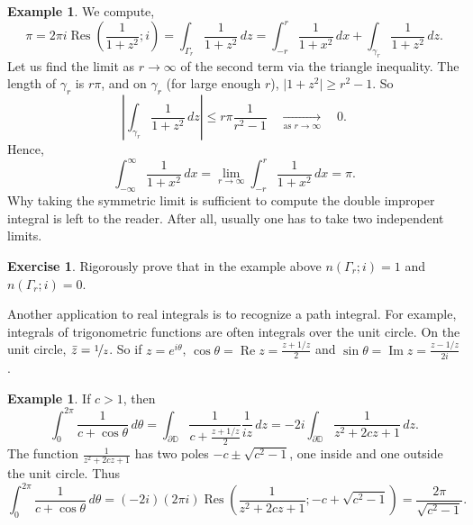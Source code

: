 \documentclass[12pt,openany]{book}
\renewcommand{\Re}{\operatorname{Re}}
\renewcommand{\Im}{\operatorname{Im}}
\newcommand{\sabs}[1]{\lvert {#1} \rvert}
\newcommand{\abs}[1]{\left\lvert {#1} \right\rvert}
\newcommand{\D}{{\mathbb{D}}}
\theoremstyle{plain}
\theoremstyle{remark}
\theoremstyle{definition}
\newenvironment{exbox}{%
    \def\FrameCommand{\vrule width 1pt \relax\hspace{10pt}}%
    \MakeFramed{\advance\hsize-\width\FrameRestore}%
}{%
    \endMakeFramed
}
\theoremstyle{exercise}
\newtheorem{exercise}{Exercise}[section]
\theoremstyle{example}
\newtheorem{example}[thm]{Example}
\begin{document}
\begin{example}
We compute,
\begin{equation*}
\pi 
=
2 \pi i \operatorname{Res}\left(\frac{1}{1+z^2};i\right) =
\int_{\Gamma_r} \frac{1}{1+z^2} \, dz
=
\int_{-r}^r \frac{1}{1+x^2} \, dx
+
\int_{\gamma_r} \frac{1}{1+z^2} \, dz .
\end{equation*}
Let us find the limit as $r \to \infty$ of the second term
via the triangle inequality.  The length of $\gamma_r$ is $r\pi$,
and on $\gamma_r$ (for large enough $r$),
$\sabs{1+z^2} \geq r^2-1$.  So
\begin{equation*}
\abs{
\int_{\gamma_r} \frac{1}{1+z^2} \, dz 
}
\leq
r \pi \frac{1}{r^2-1}
\quad\underset{\text{as } r \to \infty}{\to}\quad 0 .
\end{equation*}
Hence,
\begin{equation*}
\int_{-\infty}^\infty
\frac{1}{1+x^2} \, dx
=
\lim_{r\to \infty} \int_{-r}^r 
\frac{1}{1+x^2} \, dx
= \pi .
\end{equation*}
Why taking the symmetric limit is sufficient to compute the double improper
integral is left to the reader.  After all, usually one has to
take two independent limits.
\end{example}

\begin{exbox}
\begin{exercise}
Rigorously prove that in the example above
$n(\Gamma_r;i) = 1$ and
$n(\Gamma_r;i) = 0$.
\end{exercise}
\end{exbox}

Another application to real integrals is to recognize 
a path integral.  For example, integrals of trigonometric functions
are often integrals over the unit circle.  On the unit
circle, $\bar{z} = \nicefrac{1}{z}$.  So if $z=e^{i\theta}$,
$\cos \theta = \Re z = \frac{z+1/z}{2}$ and
$\sin \theta = \Im z = \frac{z-1/z}{2i}$.

\begin{example}
If $c > 1$, then
\begin{equation*}
\int_0^{2\pi} \frac{1}{c+\cos \theta} \, d\theta 
=
\int_{\partial \D} \frac{1}{c+\frac{z+1/z}{2}} \frac{1}{iz} \, dz
=
-2i
\int_{\partial \D} \frac{1}{z^2 + 2cz + 1} \, dz
.
\end{equation*}
The function $\frac{1}{z^2 + 2cz + 1}$ has two poles $-c \pm \sqrt{c^2-1}$,
one inside and one outside the unit circle.  Thus
\begin{equation*}
\int_0^{2\pi} \frac{1}{c+\cos \theta} \, d\theta 
=
(-2i)
(2 \pi i)
\operatorname{Res}
\left(\frac{1}{z^2 + 2cz + 1}; -c+\sqrt{c^2-1}\right)
=
\frac{2\pi}{\sqrt{c^2-1}}
.
\end{equation*}
\end{example}
\end{document}
